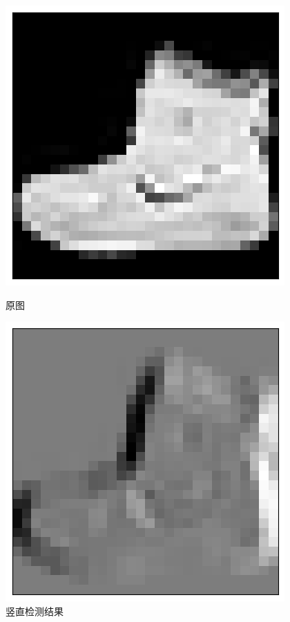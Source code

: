 \documentclass[a4paper,12pt]{article}
\begin{document}
\centering %
\begin{figure}[h]  %
    \centering
    \begin{minipage}{0.45\textwidth}
        \centering
        \includegraphics[width=\linewidth]{images/lab2_1_ori.png}
        \caption*{原图}
    \end{minipage}
    \hspace{0.05\textwidth}  %
    \begin{minipage}{0.45\textwidth}
        \centering
        \includegraphics[width=\linewidth]{images/lab2_1_ver.png}
        \caption*{竖直检测结果}
    \end{minipage}


\end{figure}
\end{document}
